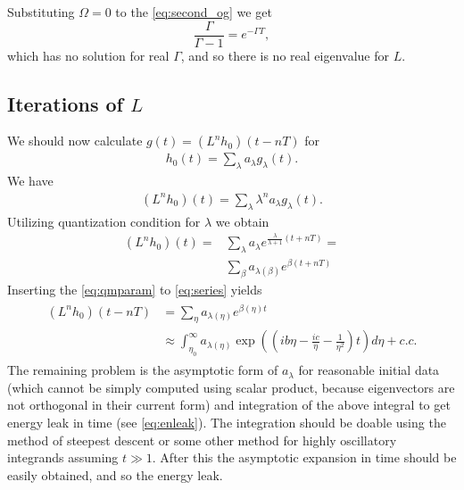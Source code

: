 \documentclass[
a4paper,%
10pt,%
titlepage,%
twoside%
]{article}
\begin{document}
Substituting $\Omega=0$ to the \eqref{eq:second_og} we get
\begin{equation}
  \label{eq:omega0}
  \frac{\Gamma}{\Gamma-1}=e^{-\Gamma T},
\end{equation}
which has no solution for real $\Gamma$, and so there is no real
eigenvalue for $L$.


\subsection{Iterations of $L$}

We should now calculate $g(t)=(L^n h_0)(t-nT)$ for
\begin{gather}
  h_0(t)=\sum_\lambda a_\lambda g_\lambda(t).
\end{gather}
We have
\begin{gather}
  (L^n h_0)(t)=\sum_\lambda \lambda^n a_\lambda g_\lambda(t).
\end{gather}
Utilizing quantization condition for $\lambda$ we obtain
\begin{align}\label{eq:series}
  (L^n h_0)(t) =&\sum_\lambda a_\lambda e^{\frac{\lambda}{\lambda+1}(t+nT)}=\\
  &\sum_\beta a_{\lambda(\beta)}e^{\beta(t+nT)}
  \end{align}
Inserting the \eqref{eq:qmparam} to \eqref{eq:series} yields
\begin{gather}\label{eq:nthfold}
  \begin{split}
    (L^n h_0)(t-nT) &=\sum_\eta a_{\lambda(\eta)} e^{\beta(\eta)t}\\
    &\approx \int_{\eta_0}^\infty a_{\lambda(\eta)}\exp((ib\eta-\frac{ic}{\eta}-\frac{1}{\eta^2})t)d\eta+c.c.
  \end{split}
\end{gather}
The remaining problem is the asymptotic form of $a_{\lambda}$ for
reasonable initial data (which cannot be simply computed using scalar
product, because eigenvectors are not orthogonal in their current
form) and integration of the above integral to get energy leak in time
(see \eqref{eq:enleak}). The integration should be doable using the
method of steepest descent or some other method for highly oscillatory
integrands assuming $t\gg 1$. After this the asymptotic expansion in
time should be easily obtained, and so the energy leak.


\end{document}
